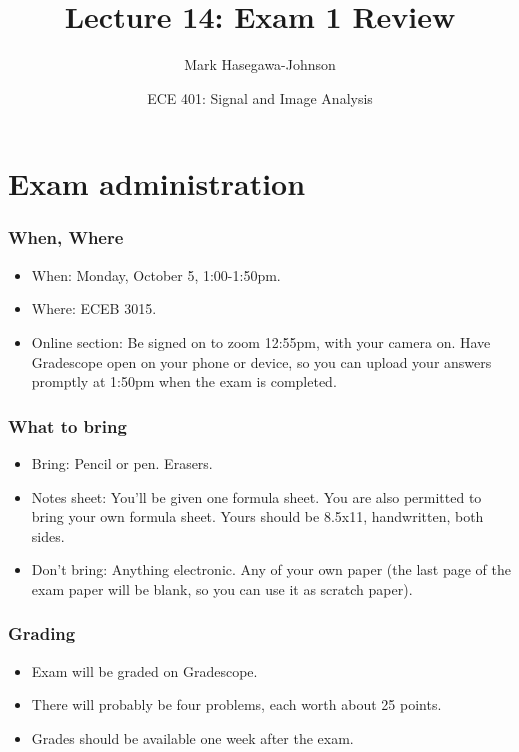 \documentclass{beamer}
\title{Lecture 14: Exam 1 Review}
\author{Mark Hasegawa-Johnson}
\date{ECE 401: Signal and Image Analysis}
\begin{document}
\begin{frame}
  \maketitle
\end{frame}

\begin{frame}
  \tableofcontents
\end{frame}

\section[Administration]{Exam administration}
\setcounter{subsection}{1}

\begin{frame}
  \frametitle{When, Where}

  \begin{itemize}
  \item When: Monday, October 5, 1:00-1:50pm.
  \item Where: ECEB 3015.
  \item Online section: Be signed on to zoom 12:55pm, with your camera
    on.  Have Gradescope open on your phone or device, so you can
    upload your answers promptly at 1:50pm when the exam is completed.
  \end{itemize}
\end{frame}

\begin{frame}
  \frametitle{What to bring}

  \begin{itemize}
  \item Bring: Pencil or pen.  Erasers.
  \item Notes sheet: You'll be given one formula sheet.  You are also permitted
    to bring your own formula sheet.  Yours should be 8.5x11, handwritten, both sides.
  \item Don't bring: Anything electronic.  Any of your own paper (the
    last page of the exam paper will be blank, so you can use it as
    scratch paper).
  \end{itemize}
\end{frame}

\begin{frame}
  \frametitle{Grading}

  \begin{itemize}
  \item Exam will be graded on Gradescope.
  \item There will probably be four problems, each worth about 25 points.
  \item Grades should be available one week after the exam.
  \end{itemize}
\end{frame}
\end{document}
